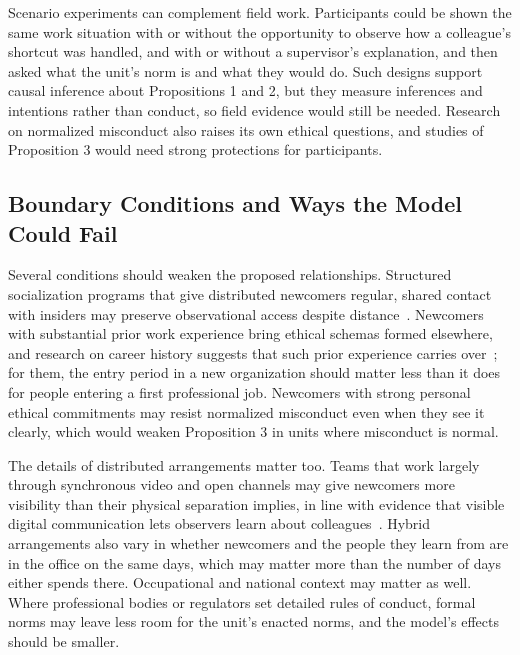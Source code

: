 \documentclass[12pt,a4paper]{article}
\theoremstyle{definition}
\begin{document}
Scenario experiments can complement field work. Participants could be shown the same work situation with or without the opportunity to observe how a colleague's shortcut was handled, and with or without a supervisor's explanation, and then asked what the unit's norm is and what they would do. Such designs support causal inference about Propositions 1 and 2, but they measure inferences and intentions rather than conduct, so field evidence would still be needed. Research on normalized misconduct also raises its own ethical questions, and studies of Proposition 3 would need strong protections for participants.

\subsection{Boundary Conditions and Ways the Model Could Fail}

Several conditions should weaken the proposed relationships. Structured socialization programs that give distributed newcomers regular, shared contact with insiders may preserve observational access despite distance~\citep{ashforth1996socialization}. Newcomers with substantial prior work experience bring ethical schemas formed elsewhere, and research on career history suggests that such prior experience carries over~\citep{dokko2009unpacking,higgins2005career}; for them, the entry period in a new organization should matter less than it does for people entering a first professional job. Newcomers with strong personal ethical commitments may resist normalized misconduct even when they see it clearly, which would weaken Proposition 3 in units where misconduct is normal.

The details of distributed arrangements matter too. Teams that work largely through synchronous video and open channels may give newcomers more visibility than their physical separation implies, in line with evidence that visible digital communication lets observers learn about colleagues~\citep{leonardi2015ambient}. Hybrid arrangements also vary in whether newcomers and the people they learn from are in the office on the same days, which may matter more than the number of days either spends there. Occupational and national context may matter as well. Where professional bodies or regulators set detailed rules of conduct, formal norms may leave less room for the unit's enacted norms, and the model's effects should be smaller.
\end{document}
